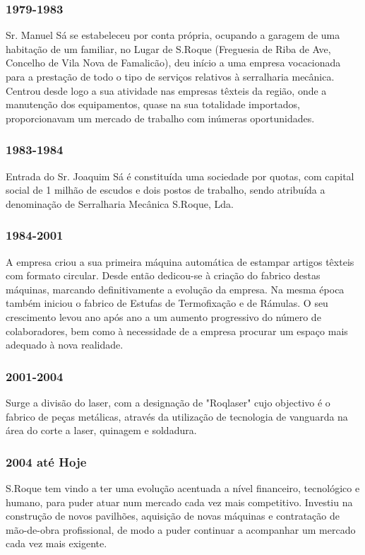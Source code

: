 \begin{frame}
\frametitle{1979-1983}
Sr. Manuel Sá se estabeleceu por conta própria, ocupando a garagem de uma habitação de um familiar, no Lugar de S.Roque (Freguesia de Riba de Ave, Concelho de Vila Nova de Famalicão), deu início a uma empresa vocacionada para a prestação de todo o tipo de serviços relativos à serralharia mecânica. Centrou desde logo a sua atividade nas empresas têxteis da região, onde a manutenção dos equipamentos, quase na sua totalidade importados, proporcionavam um mercado de trabalho com inúmeras oportunidades.
\end{frame}
\begin{frame}
\frametitle{1983-1984}
Entrada do Sr. Joaquim Sá é constituída uma sociedade por quotas, com capital social de 1 milhão de escudos e dois postos de trabalho, sendo atribuída a denominação de Serralharia Mecânica S.Roque, Lda.
\end{frame}
\begin{frame}
\frametitle{1984-2001}
A empresa criou a sua primeira máquina automática de estampar artigos têxteis com formato circular. Desde então dedicou-se à criação do fabrico destas máquinas, marcando definitivamente a evolução da empresa. Na mesma época também iniciou o fabrico de Estufas de Termofixação e de Rámulas. O seu crescimento levou ano após ano a um aumento progressivo do número de colaboradores, bem como à necessidade de a empresa procurar um espaço mais adequado à nova realidade.
\end{frame}
\begin{frame}
\frametitle{2001-2004}
Surge a divisão do laser, com a designação de "Roqlaser" cujo objectivo é o fabrico de peças metálicas, através da utilização de tecnologia de vanguarda na área do corte a laser, quinagem e soldadura.
\end{frame}
\begin{frame}
\frametitle{2004 até Hoje}
S.Roque tem vindo a ter uma evolução acentuada a nível financeiro, tecnológico e humano, para puder atuar num mercado cada vez mais competitivo. Investiu na construção de novos pavilhões, aquisição de novas máquinas e contratação de mão-de-obra profissional, de modo a puder continuar a acompanhar um mercado cada vez mais exigente.
\end{frame}
